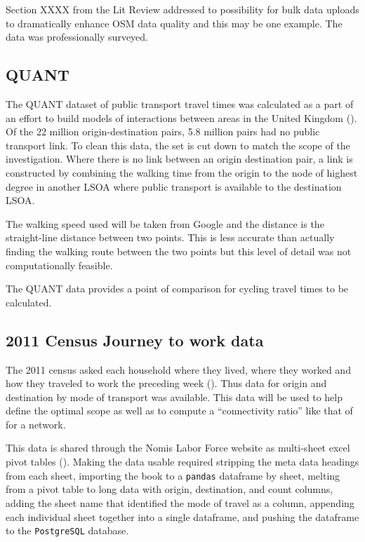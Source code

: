 Section XXXX from the Lit Review addressed to possibility for bulk data uploads to dramatically enhance OSM data quality and this may be one example. The data was professionally surveyed. 

\subsection{QUANT}

The QUANT dataset of public transport travel times was calculated as a part of an effort to build models of interactions between areas in the United Kingdom (\cite{quant}). Of the 22 million origin-destination pairs, 5.8 million pairs had no public transport link. To clean this data, the set is cut down to match the scope of the investigation. Where there is no link between an origin destination pair, a link is constructed by combining the walking time from the origin to the node of highest degree in another LSOA where public transport is available to the destination LSOA. 

The walking speed used will be taken from Google and the distance is the straight-line distance between two points. This is less accurate than actually finding the walking route between the two points but this level of detail was not computationally feasible. 

The QUANT data provides a point of comparison for cycling travel times to be calculated. 

\subsection{2011 Census Journey to work data}

The 2011 census asked each household where they lived, where they worked and how they traveled to work the preceding week (\cite{jtw}). Thus data for origin and destination by mode of transport was available. This data will be used to help define the optimal scope as well as to compute a ``connectivity ratio'' like that of \cite{furth2016network} for a network. 

This data is shared through the Nomis Labor Force website as multi-sheet excel pivot tables (\cite{nomis}). Making the data usable required stripping the meta data headings from each sheet, importing the book to a \texttt{pandas} dataframe by sheet, melting from a pivot table to long data with origin, destination, and count columns, adding the sheet name that identified the mode of travel as a column, appending each individual sheet together into a single dataframe, and pushing the dataframe to the \texttt{PostgreSQL} database. 

